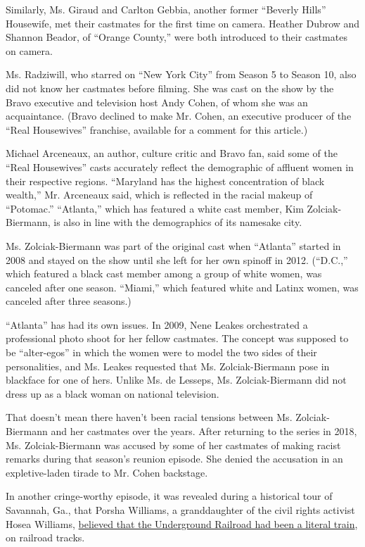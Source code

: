 Similarly, Ms. Giraud and Carlton Gebbia, another former ``Beverly
Hills'' Housewife, met their castmates for the first time on camera.
Heather Dubrow and Shannon Beador, of ``Orange County,'' were both
introduced to their castmates on camera.

Ms. Radziwill, who starred on ``New York City'' from Season 5 to Season
10, also did not know her castmates before filming. She was cast on the
show by the Bravo executive and television host Andy Cohen, of whom she
was an acquaintance. (Bravo declined to make Mr. Cohen, an executive
producer of the ``Real Housewives'' franchise, available for a comment
for this article.)

Michael Arceneaux, an author, culture critic and Bravo fan, said some of
the ``Real Housewives'' casts accurately reflect the demographic of
affluent women in their respective regions. ``Maryland has the highest
concentration of black wealth,'' Mr. Arceneaux said, which is reflected
in the racial makeup of ``Potomac.'' ``Atlanta,'' which has featured a
white cast member, Kim Zolciak-Biermann, is also in line with the
demographics of its namesake city.

Ms. Zolciak-Biermann was part of the original cast when ``Atlanta''
started in 2008 and stayed on the show until she left for her own
spinoff in 2012. (``D.C.,'' which featured a black cast member among a
group of white women, was canceled after one season. ``Miami,'' which
featured white and Latinx women, was canceled after three seasons.)

``Atlanta'' has had its own issues. In 2009, Nene Leakes orchestrated a
professional photo shoot for her fellow castmates. The concept was
supposed to be ``alter-egos'' in which the women were to model the two
sides of their personalities, and Ms. Leakes requested that Ms.
Zolciak-Biermann pose in blackface for one of hers. Unlike Ms. de
Lesseps, Ms. Zolciak-Biermann did not dress up as a black woman on
national television.

That doesn't mean there haven't been racial tensions between Ms.
Zolciak-Biermann and her castmates over the years. After returning to
the series in 2018, Ms. Zolciak-Biermann was accused by some of her
castmates of making racist remarks during that season's reunion episode.
She denied the accusation in an expletive-laden tirade to Mr. Cohen
backstage.

In another cringe-worthy episode, it was revealed during a historical
tour of Savannah, Ga., that Porsha Williams, a granddaughter of the
civil rights activist Hosea Williams,
\href{https://www.bravotv.com/the-real-housewives-of-atlanta/season-6/episode-8/videos/confused-by-the-underground-railroad}{believed
that the Underground Railroad had been a literal train}, on railroad
tracks.


